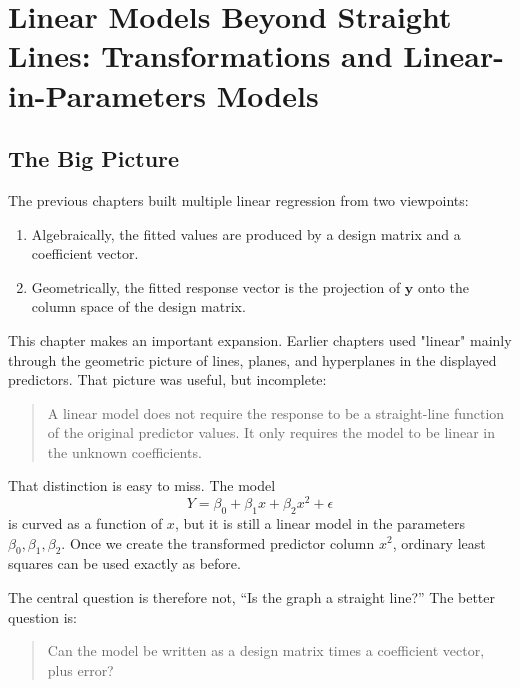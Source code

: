 \chapter[Linear Models Beyond Straight Lines]{Linear Models Beyond Straight Lines: Transformations and Linear-in-Parameters Models}
\label{chap:linear-models-beyond-straight-lines}

\section{The Big Picture}

The previous chapters built multiple linear regression from two viewpoints:
\begin{enumerate}
  \item Algebraically, the fitted values are produced by a design matrix and a coefficient vector.
  \item Geometrically, the fitted response vector is the projection of \(\mathbf{y}\) onto the column space of the design matrix.
\end{enumerate}

This chapter makes an important expansion.  Earlier chapters used "linear" mainly through the geometric picture of lines, planes, and hyperplanes in the displayed predictors.  That picture was useful, but incomplete:
\begin{quote}
  A linear model does not require the response to be a straight-line function of the original predictor values.  It only requires the model to be linear in the unknown coefficients.
\end{quote}

That distinction is easy to miss.  The model
\begin{equation}
  Y=\beta_0+\beta_1x+\beta_2x^2+\epsilon
\end{equation}
is curved as a function of \(x\), but it is still a linear model in the parameters \(\beta_0,\beta_1,\beta_2\).  Once we create the transformed predictor column \(x^2\), ordinary least squares can be used exactly as before.

The central question is therefore not, ``Is the graph a straight line?''  The better question is:
\begin{quote}
  Can the model be written as a design matrix times a coefficient vector, plus error?
\end{quote}

